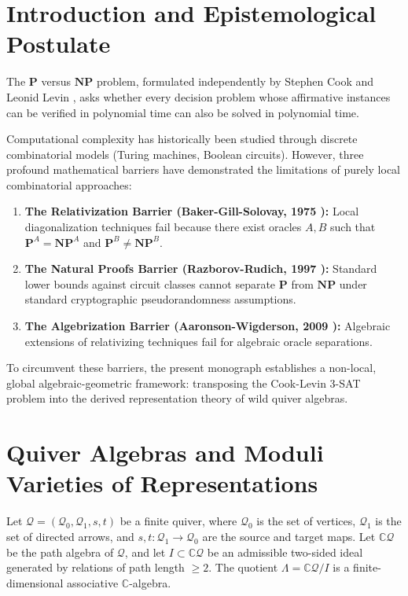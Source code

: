 \documentclass[11pt,a4paper]{article}
\theoremstyle{definition}
\begin{document}
\newpage
\tableofcontents
\newpage

\section{Introduction and Epistemological Postulate}
The $\mathbf{P}$ versus $\mathbf{NP}$ problem, formulated independently by Stephen Cook \cite{cook1971} and Leonid Levin \cite{levin1973}, asks whether every decision problem whose affirmative instances can be verified in polynomial time can also be solved in polynomial time.

Computational complexity has historically been studied through discrete combinatorial models (Turing machines, Boolean circuits). However, three profound mathematical barriers have demonstrated the limitations of purely local combinatorial approaches:
\begin{enumerate}
    \item \textbf{The Relativization Barrier (Baker-Gill-Solovay, 1975 \cite{baker1975}):} Local diagonalization techniques fail because there exist oracles $A, B$ such that $\mathbf{P}^A = \mathbf{NP}^A$ and $\mathbf{P}^B \neq \mathbf{NP}^B$.
    \item \textbf{The Natural Proofs Barrier (Razborov-Rudich, 1997 \cite{razborov1997}):} Standard lower bounds against circuit classes cannot separate $\mathbf{P}$ from $\mathbf{NP}$ under standard cryptographic pseudorandomness assumptions.
    \item \textbf{The Algebrization Barrier (Aaronson-Wigderson, 2009 \cite{aaronson2009}):} Algebraic extensions of relativizing techniques fail for algebraic oracle separations.
\end{enumerate}

To circumvent these barriers, the present monograph establishes a non-local, global algebraic-geometric framework: transposing the Cook-Levin 3-SAT problem into the derived representation theory of wild quiver algebras.

\section{Quiver Algebras and Moduli Varieties of Representations}
Let $\mathcal{Q} = (\mathcal{Q}_0, \mathcal{Q}_1, s, t)$ be a finite quiver, where $\mathcal{Q}_0$ is the set of vertices, $\mathcal{Q}_1$ is the set of directed arrows, and $s, t : \mathcal{Q}_1 \to \mathcal{Q}_0$ are the source and target maps.
Let $\mathbb{C}\mathcal{Q}$ be the path algebra of $\mathcal{Q}$, and let $I \subset \mathbb{C}\mathcal{Q}$ be an admissible two-sided ideal generated by relations of path length $\ge 2$. The quotient $\Lambda = \mathbb{C}\mathcal{Q} / I$ is a finite-dimensional associative $\mathbb{C}$-algebra.
\end{document}
